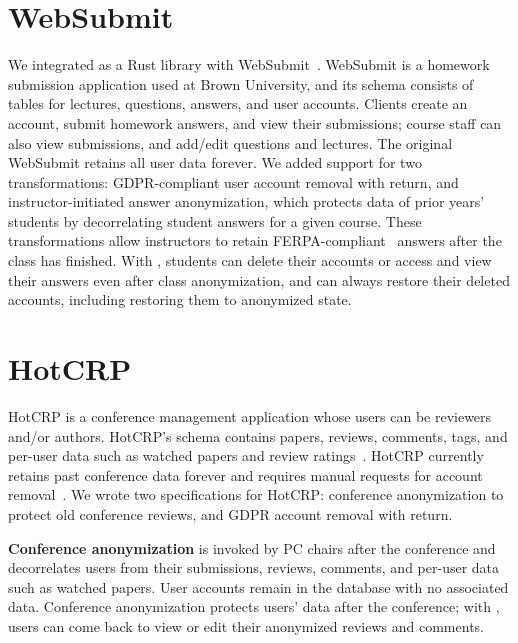 \section{WebSubmit}
\label{s:case-websubmit}

%
We integrated \sys as a Rust library with WebSubmit~\cite{websubmit-rs}.
%
WebSubmit is a homework submission application used at Brown University, and
its schema consists of tables for lectures, questions, answers, and user accounts.
%
Clients create an account, submit homework answers, and view their submissions;
course staff can also view submissions, and add/edit questions and lectures.
%
The original WebSubmit retains all user data forever.
%
We added support for two \xxing
transformations: {GDPR-compliant user account removal} with return, and
{instructor-initiated answer anonymization}, which protects data of prior years'
students by decorrelating student answers for a given course.
%
These transformations allow instructors to retain FERPA-compliant~\cite{ferpa}
answers after the class has finished. %
%
With \sys, students can delete their
accounts or access and view their answers even after class anonymization,
and can always restore their deleted accounts, including restoring them to
anonymized state.
%
%


\section{HotCRP}
\label{s:case-hotcrp}

%
HotCRP is a conference management application whose users can be reviewers and/or
authors.
%
HotCRP's schema contains papers, reviews, comments, tags,
and per-user data such as watched papers and review ratings~\cite{hotcrp}.
%
HotCRP currently retains past conference data forever and requires manual
requests for account removal~\cite{hotcrp:privacy}.
%
We wrote two \xx specifications for HotCRP: conference anonymization to
protect old conference reviews, and GDPR account removal with
return.
%

%
\textbf{Conference anonymization} is invoked by PC chairs after the conference
and decorrelates users from their submissions, reviews, comments, and
per-user data such as watched papers.
%
User accounts remain in the database with no associated data.
%
Conference anonymization protects users' data after the conference; with \sys,
users can come back to view or edit their anonymized reviews and comments.
%

